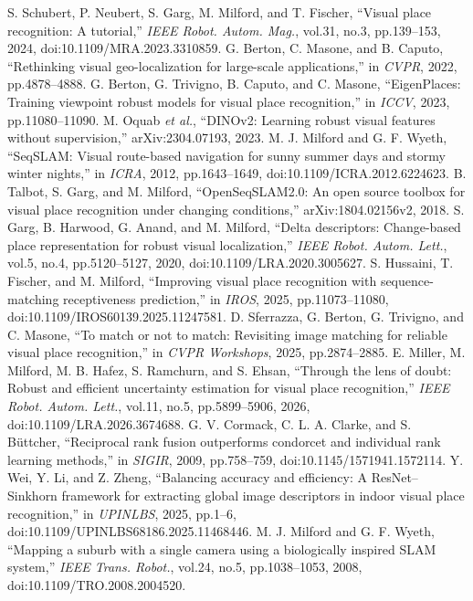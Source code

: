  S. Schubert, P. Neubert, S. Garg, M. Milford, and T. Fischer, ``Visual place recognition: A tutorial,'' \emph{IEEE Robot. Autom. Mag.}, vol.31, no.3, pp.139--153, 2024, doi:10.1109/MRA.2023.3310859.
 G. Berton, C. Masone, and B. Caputo, ``Rethinking visual geo-localization for large-scale applications,'' in \emph{CVPR}, 2022, pp.4878--4888.
 G. Berton, G. Trivigno, B. Caputo, and C. Masone, ``EigenPlaces: Training viewpoint robust models for visual place recognition,'' in \emph{ICCV}, 2023, pp.11080--11090.
 M. Oquab \emph{et al.}, ``DINOv2: Learning robust visual features without supervision,'' arXiv:2304.07193, 2023.
 M. J. Milford and G. F. Wyeth, ``SeqSLAM: Visual route-based navigation for sunny summer days and stormy winter nights,'' in \emph{ICRA}, 2012, pp.1643--1649, doi:10.1109/ICRA.2012.6224623.
 B. Talbot, S. Garg, and M. Milford, ``OpenSeqSLAM2.0: An open source toolbox for visual place recognition under changing conditions,'' arXiv:1804.02156v2, 2018.
 S. Garg, B. Harwood, G. Anand, and M. Milford, ``Delta descriptors: Change-based place representation for robust visual localization,'' \emph{IEEE Robot. Autom. Lett.}, vol.5, no.4, pp.5120--5127, 2020, doi:10.1109/LRA.2020.3005627.
 S. Hussaini, T. Fischer, and M. Milford, ``Improving visual place recognition with sequence-matching receptiveness prediction,'' in \emph{IROS}, 2025, pp.11073--11080, doi:10.1109/IROS60139.2025.11247581.
 D. Sferrazza, G. Berton, G. Trivigno, and C. Masone, ``To match or not to match: Revisiting image matching for reliable visual place recognition,'' in \emph{CVPR Workshops}, 2025, pp.2874--2885.
 E. Miller, M. Milford, M. B. Hafez, S. Ramchurn, and S. Ehsan, ``Through the lens of doubt: Robust and efficient uncertainty estimation for visual place recognition,'' \emph{IEEE Robot. Autom. Lett.}, vol.11, no.5, pp.5899--5906, 2026, doi:10.1109/LRA.2026.3674688.
 G. V. Cormack, C. L. A. Clarke, and S. B\"uttcher, ``Reciprocal rank fusion outperforms condorcet and individual rank learning methods,'' in \emph{SIGIR}, 2009, pp.758--759, doi:10.1145/1571941.1572114.
 Y. Wei, Y. Li, and Z. Zheng, ``Balancing accuracy and efficiency: A ResNet--Sinkhorn framework for extracting global image descriptors in indoor visual place recognition,'' in \emph{UPINLBS}, 2025, pp.1--6, doi:10.1109/UPINLBS68186.2025.11468446.
 M. J. Milford and G. F. Wyeth, ``Mapping a suburb with a single camera using a biologically inspired SLAM system,'' \emph{IEEE Trans. Robot.}, vol.24, no.5, pp.1038--1053, 2008, doi:10.1109/TRO.2008.2004520.

